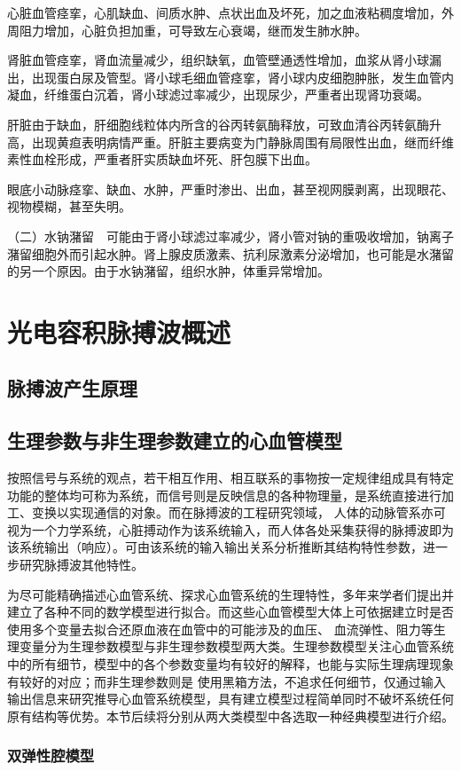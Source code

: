 心脏血管痉挛，心肌缺血、间质水肿、点状出血及坏死，加之血液粘稠度增加，外周阻力增加，心脏负担加重，可导致左心衰竭，继而发生肺水肿。

肾脏血管痉挛，肾血流量减少，组织缺氧，血管壁通透性增加，血浆从肾小球漏出，出现蛋白尿及管型。肾小球毛细血管痉挛，肾小球内皮细胞肿胀，发生血管内凝血，纤维蛋白沉着，肾小球滤过率减少，出现尿少，严重者出现肾功衰竭。

肝脏由于缺血，肝细胞线粒体内所含的谷丙转氨酶释放，可致血清谷丙转氨酶升高，出现黄疸表明病情严重。肝脏主要病变为门静脉周围有局限性出血，继而纤维素性血栓形成，严重者肝实质缺血坏死、肝包膜下出血。

眼底小动脉痉挛、缺血、水肿，严重时渗出、出血，甚至视网膜剥离，出现眼花、视物模糊，甚至失明。

（二）水钠潴留　可能由于肾小球滤过率减少，肾小管对钠的重吸收增加，钠离子潴留细胞外而引起水肿。肾上腺皮质激素、抗利尿激素分泌增加，也可能是水潴留的另一个原因。由于水钠潴留，组织水肿，体重异常增加。
\section{光电容积脉搏波概述}
\subsection{脉搏波产生原理}
\subsection{生理参数与非生理参数建立的心血管模型}
按照信号与系统的观点，若干相互作用、相互联系的事物按一定规律组成具有特定功能的整体均可称为系统，而信号则是反映信息的各种物理量，是系统直接进行加工、变换以实现通信的对象。而在脉搏波的工程研究领域，
人体的动脉管系亦可视为一个力学系统，心脏搏动作为该系统输入，而人体各处采集获得的脉搏波即为该系统输出（响应）。可由该系统的输入输出关系分析推断其结构特性参数，进一步研究脉搏波其他特性。\cite{PPGYY}

为尽可能精确描述心血管系统、探求心血管系统的生理特性，多年来学者们提出并建立了各种不同的数学模型进行拟合。而这些心血管模型大体上可依据建立时是否使用多个变量去拟合还原血液在血管中的可能涉及的血压、
血流弹性、阻力等生理变量分为生理参数模型与非生理参数模型两大类。\cite{PPGYY}生理参数模型关注心血管系统中的所有细节，模型中的各个参数变量均有较好的解释，也能与实际生理病理现象有较好的对应；而非生理参数则是
使用黑箱方法，不追求任何细节，仅通过输入输出信息来研究推导心血管系统模型，具有建立模型过程简单同时不破坏系统任何原有结构等优势。本节后续将分别从两大类模型中各选取一种经典模型进行介绍。
\subsubsection{双弹性腔模型}
